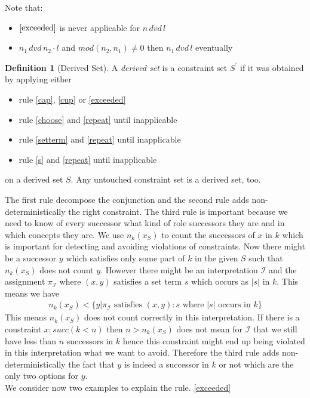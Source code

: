 \documentclass[a4paper,11pt]{scrartcl}
\theoremstyle{break}
\theoremstyle{definition}
\newtheorem{mydef}{Definition}
\begin{document}
Note that:
\begin{itemize}
\item $\ref{exceeded}$ is never applicable for $n\, dvd\, l$
\item $n_1\,dvd\,n_2\cdot l$ and $mod(n_2,n_1)\neq 0$ then $n_1\,dvd\,l$ eventually
\end{itemize}
\begin{mydef}[Derived Set]
A \textit{derived set} is a constraint set $S^\prime$ if it was obtained by applying either
\begin{itemize}
\item rule \ref{cap}, \ref{cup} or \ref{exceeded}
\item rule \ref{choose} and \ref{repeat} until inapplicable 
\item rule \ref{setterm} and \ref{repeat} until inapplicable
\item rule \ref{s} and \ref{repeat} until inapplicable
\end{itemize}
on a derived set $S$. Any untouched constraint set is a derived set, too.
\end{mydef}
The first rule decompose the conjunction and the second rule adds non-deterministically the right constraint. The third rule is important because we need to know of every successor what kind of role successors they are and in which concepts they are. We use $n_k(x_S)$ to count the successors of $x$ in $k$ which is important for detecting and avoiding violations of constraints. Now there might be a successor $y$ which satisfies only some part of $k$ in the given $S$ such that $n_k(x_S)$ does not count $y$. However there might be an interpretation $\mathcal{I}$ and the assignment $\pi_\mathcal{I}$ where $(x,y)$ satisfies a set term $s$ which occurs as $|s|$ in $k$. This means we have
\begin{align*}
n_k(x_S)<\{y|\pi_\mathcal{I}\text{ satisfies } (x,y):s\text{ where } |s| \text{ occurs in } k\}
\end{align*}
This means $n_k(x_S)$ does not count correctly in this interpretation. If there is a constraint $x:succ(k<n)$ then $n>n_k(x_S)$ does not mean for $\mathcal{I}$ that we still have less than $n$ successors in $k$ hence this constraint might end up being violated in this interpretation what we want to avoid. Therefore the third rule adds non-deterministically the fact that $y$ is indeed a successor in $k$ or not which are the only two options for $y$.\\
We consider now two examples to explain the rule. \ref{exceeded}
\end{document}
